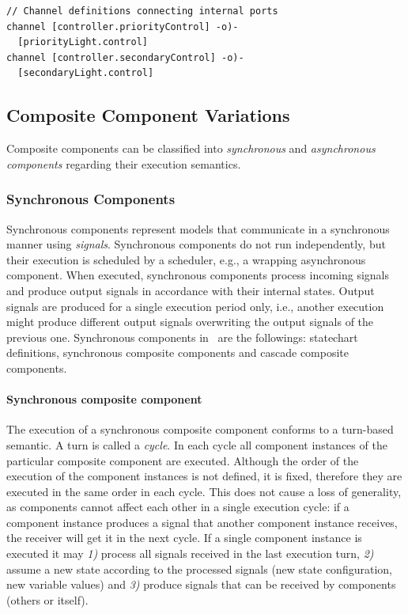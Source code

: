 \begin{lstlisting}
// Channel definitions connecting internal ports
channel [controller.priorityControl] -o)-
  [priorityLight.control]
channel [controller.secondaryControl] -o)-
  [secondaryLight.control]
\end{lstlisting}

\subsection{Composite Component Variations}
Composite components can be classified into \emph{synchronous} and \emph{asynchronous components} regarding their execution semantics.

\subsubsection{Synchronous Components}
Synchronous components represent models that communicate
in a synchronous manner using \emph{signals}. Synchronous components do not run independently, but their
execution is scheduled by a scheduler, e.g., a wrapping asynchronous component. When executed, synchronous components process incoming signals
and produce output signals in accordance with their internal states. Output signals are
produced for a single execution period only, i.e., another execution might produce different
output signals overwriting the output signals of the previous one. Synchronous components in \gamma\ are the followings:  statechart definitions, synchronous composite
components and cascade composite components.

\paragraph{Synchronous composite component} The execution of a synchronous composite component
conforms to a turn-based semantic. A turn is called a \emph{cycle}. In each cycle all component instances of the particular composite component are executed. Although the order of the execution of the component instances is not defined, it is fixed, therefore they are executed in the same order in each cycle. This does not cause a loss of generality, as components cannot affect each other in a single execution cycle: if a component instance produces a signal that another component instance receives, the receiver will get it in the next cycle. If a single component instance is executed it may \textit{1)} process all signals received in the last execution turn, \textit{2)} assume a new state according to the processed signals (new state configuration, new variable values) and \textit{3)} produce signals that can be received by components (others or itself).

